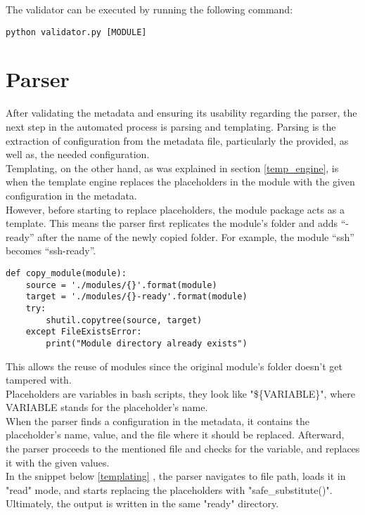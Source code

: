 The validator can be executed by running the following command:
\begin{lstlisting}[caption=Validator command, style=pythonstyle]
python validator.py [MODULE]
\end{lstlisting}
\clearpage


\section{Parser}
After validating the metadata and ensuring its usability regarding the parser, the next step in the automated process is parsing and templating. Parsing is the extraction of configuration from the metadata file, particularly the provided, as well as, the needed configuration.\\
Templating, on the other hand, as was explained in section \ref{temp_engine}, is when the template engine replaces the placeholders in the module with the given configuration in the metadata.\\ However, before starting to replace placeholders, the module package acts as a template. This means the parser first replicates the module’s folder and adds “-ready” after the name of the newly copied folder. For example, the module “ssh” becomes “ssh-ready”.\\

\begin{lstlisting}[caption=Copying directories, style=pythonstyle]
def copy_module(module):
    source = './modules/{}'.format(module)
    target = './modules/{}-ready'.format(module)
    try:
        shutil.copytree(source, target)
    except FileExistsError:
        print("Module directory already exists")
\end{lstlisting}
This allows the reuse of modules since the original module’s folder doesn’t get tampered with.\\
Placeholders are variables in bash scripts, they look like "\$\{VARIABLE\}", where VARIABLE stands for the placeholder’s name.\\ When the parser finds a configuration in the metadata, it contains the placeholder’s name, value, and the file where it should be replaced. Afterward, the parser proceeds to the mentioned file and checks for the variable, and replaces it with the given values.\\
In the snippet below \ref{templating} , the parser navigates to file path, loads it in "read" mode, and starts replacing the placeholders with "safe\_substitute()". Ultimately, the output is written in the same "ready" directory.

